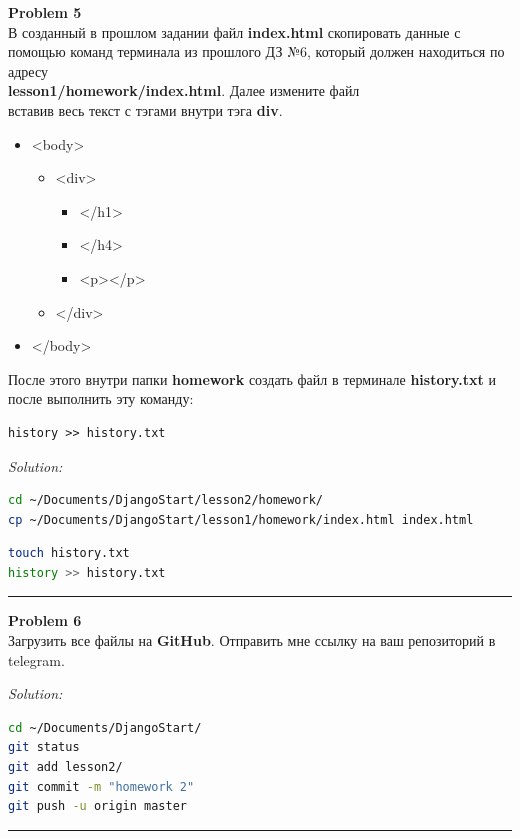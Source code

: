\documentclass[a4paper, 11pt]{extarticle}
\newenvironment{problem}[2][Problem]
    { \begin{mdframed}[backgroundcolor=gray!20] \textbf{#1 #2} \\}
    {  \end{mdframed}}
\newenvironment{solution}
    {\textit{Solution:}}
    {}
\begin{document}
\begin{problem}{5}
В созданный в прошлом задании файл \textbf{index.html} скопировать данные с помощью команд терминала из прошлого ДЗ №6, который должен находиться по адресу\\ \textbf{lesson1/homework/index.html}. Далее измените файл \\вставив весь текст с тэгами внутри тэга \textbf{div}.

\begin{itemize}
\item <body>
\begin{itemize}
\item <div>
\begin{itemize}
\item <h1></h1>
\item <h4></h4>
\item <p></p>
\end{itemize}
\item </div>
\end{itemize}
\item </body>
\end{itemize}
После этого внутри папки \textbf{homework} создать файл в терминале \textbf{history.txt} и после выполнить эту команду:
\begin{lstlisting}
history >> history.txt
\end{lstlisting}
\end{problem}
\begin{solution} 
\begin{lstlisting}[language=Bash]
cd ~/Documents/DjangoStart/lesson2/homework/
cp ~/Documents/DjangoStart/lesson1/homework/index.html index.html
\end{lstlisting}
\vspace{-1.5em}

\begin{lstlisting}[language=Bash]
touch history.txt
history >> history.txt
\end{lstlisting}
\vspace{-2.5em}
\end{solution} 
\noindent\rule{6.257in}{2.8pt}



\begin{problem}{6}
Загрузить все файлы на \textbf{GitHub}. Отправить мне ссылку на ваш репозиторий в telegram.
\end{problem}
\begin{solution} 
\begin{lstlisting}[language=Bash]
cd ~/Documents/DjangoStart/
git status
git add lesson2/
git commit -m "homework 2"
git push -u origin master
\end{lstlisting}
\end{solution} 
\noindent\rule{6.257in}{2.8pt}
\end{document}
